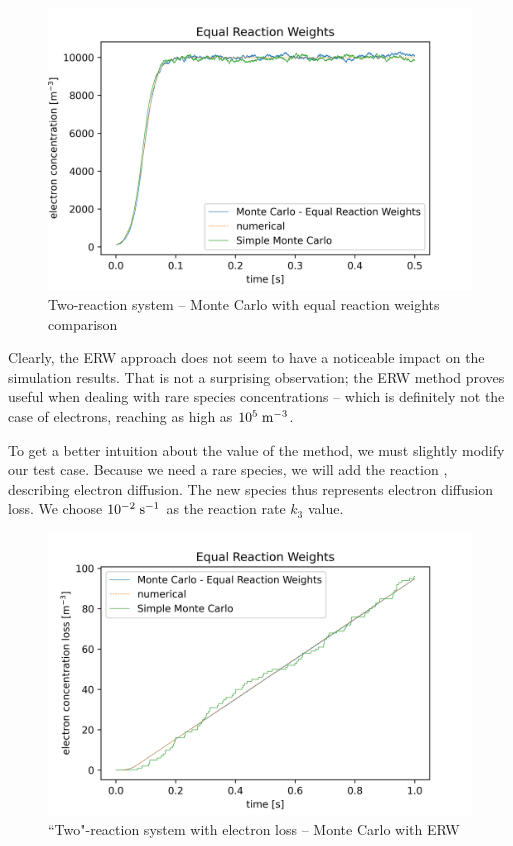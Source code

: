 \begin{figure} 
    \centering
    \includegraphics[width=\textwidth]{grafy/2reaction_EqReactionWeights.png}
    \caption{Two-reaction system -- Monte Carlo with equal reaction weights comparison}
    \label{fig:2reaction_EqReactionWeights}
\end{figure}

Clearly, the ERW approach does not seem to have a noticeable impact on the simulation results. That is not a surprising observation; the ERW method proves useful when dealing with rare species concentrations -- which is definitely not the case of electrons, reaching as high as $10^5\;\rm m^{-3}$.

To get a better intuition about the value of the method, we must slightly modify our test case. Because we need a rare species, we will add the reaction , describing electron diffusion. The new species  thus represents electron diffusion loss. We choose $10^{-2}\;\rm s^{-1}$ as the reaction rate $k_3$ value.


\begin{figure} 
    \centering
    \includegraphics[width=\textwidth]{grafy/EqReactionWeights.png}
    \caption{``Two"-reaction system with electron loss -- Monte Carlo with ERW}
    \label{fig:EqReactionWeights}
\end{figure}


